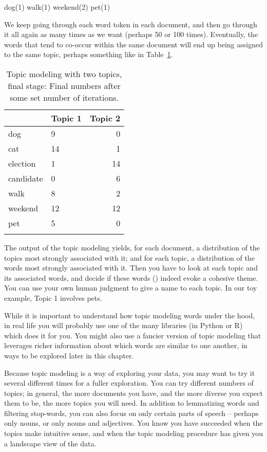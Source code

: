 \ea  dog(1) walk(1) weekend(2) pet(1)
\z

We keep going through each word token in each document, and then go
through it all again as many times as we want (perhaps 50 or 100
times).  Eventually, the words that tend to co-occur within the same
document will end up being assigned to the same topic, perhaps
something like in Table~\ref{tab:topic-modeling3}.

\begin{table}
\begin{tabular}{llr}
\lsptoprule
& Topic 1 & Topic 2 \\ \midrule
dog & 9 & 0 \\
cat & 14 & 1 \\ 
election & 1  & 14 \\ 
candidate & 0 & 6  \\
walk & 8 & 2 \\ 
weekend & 12 & 12 \\ 
pet & 5 & 0 \\ 
\lspbottomrule
\end{tabular}
\caption{Topic modeling with two topics, final stage: Final numbers after some set number of iterations.}
\label{tab:topic-modeling3}
\end{table}

The output of the topic modeling yields, for each document, a
distribution of the topics most strongly associated with it; and for
each topic, a distribution of the words most strongly associated with
it.  Then you have to look at each topic and its associated words, and
decide if these words () indeed evoke a cohesive
theme.  You can use your own human judgment to give a name to each
topic. In our  toy example, Topic 1 involves pets.

While it is important to understand how topic modeling words under the
hood, in real life you will probably use one of the many libraries (in
Python or R) which does it for you.  You might also use a fancier
version of topic modeling that leverages richer information about
which words are similar to one another, in ways to be explored later
in this chapter.

Because topic modeling is a way of exploring your data, you may want
to try it several different times for a fuller exploration. You can try different numbers of topics; in general, the more
documents you have, and the more diverse you expect them to be, the
more topics you will need. In addition to lemmatizing words and
filtering stop-words, you can also focus on only certain parts of
speech -- perhaps only nouns, or only nouns and adjectives.  You know
you have succeeded when the topics make intuitive sense, and when the
topic modeling procedure has given you a landscape view of the data.

